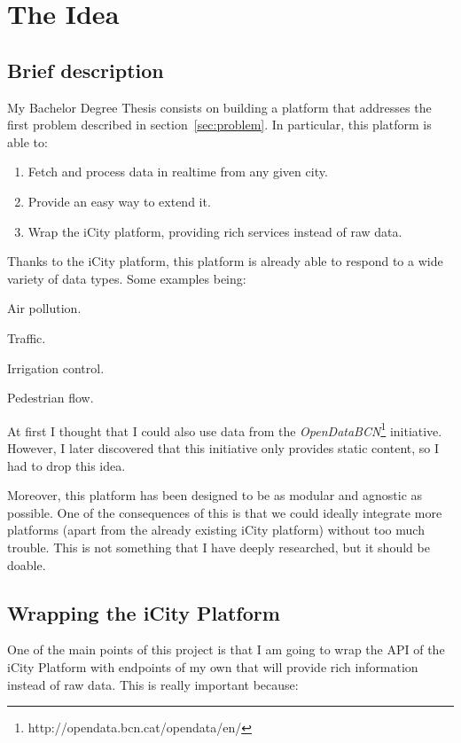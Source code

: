 
\section{The Idea}

\subsection{Brief description}
\label{sec:description}

My Bachelor Degree Thesis consists on building a platform that addresses the
first problem described in section~\ref{sec:problem}. In particular, this
platform is able to:

\begin{enumerate}
  \itemsep0em
  \item Fetch and process data in realtime from any given city.
  \item Provide an easy way to extend it.
  \item Wrap the iCity platform, providing rich services instead of raw data.
\end{enumerate}

Thanks to the iCity platform, this platform is already able to respond to a
wide variety of data types. Some examples being:

\mylist
  \item Air pollution.
  \item Traffic.
  \item Irrigation control.
  \item Pedestrian flow.
\mylistend

At first I thought that I could also use data from the {\it
OpenDataBCN}\footnote{http://opendata.bcn.cat/opendata/en/} initiative.
However, I later discovered that this initiative only provides static content,
so I had to drop this idea.

Moreover, this platform has been designed to be as modular and agnostic as
possible. One of the consequences of this is that we could ideally integrate
more platforms (apart from the already existing iCity platform) without too much
trouble. This is not something that I have deeply researched, but it should be
doable.

\subsection{Wrapping the iCity Platform}

One of the main points of this project is that I am going to wrap the API of
the iCity Platform with endpoints of my own that will provide rich information
instead of raw data. This is really important because:

